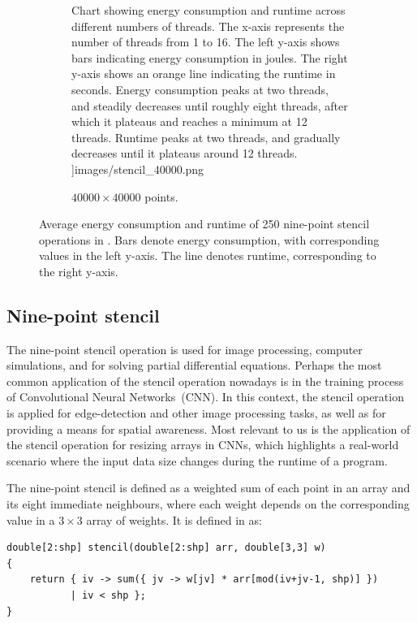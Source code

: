 \begin{figure}[!ht]
\begin{subfigure}{0.33\linewidth}
{            Chart showing energy consumption and runtime across different numbers of threads. The
            x-axis represents the number of threads from 1 to 16. The left y-axis shows bars
            indicating energy consumption in joules. The right y-axis shows an orange line
            indicating the runtime in seconds. Energy consumption peaks at two threads, and steadily
            decreases until roughly eight threads, after which it plateaus and reaches a minimum at
            12 threads. Runtime peaks at two threads, and gradually decreases until it plateaus
            around 12 threads.
        }]{images/stencil_40000.png}
        \caption{$40000 \times 40000$ points.}
        \label{fig:stencil3}
    \end{subfigure}%
    \caption{Average energy consumption and runtime of 250 nine-point stencil operations in \sac{}.
    Bars denote energy consumption, with corresponding values in the left y-axis.
    The line denotes runtime, corresponding to the right y-axis.}
    \label{fig:stencil}
\end{figure}

\subsection{Nine-point stencil}\label{sec:stencil}

The nine-point stencil operation is used for image processing, computer simulations, and for solving
partial differential equations. Perhaps the most common application of the stencil operation
nowadays is in the training process of Convolutional Neural Networks~(CNN). In this context, the
stencil operation is applied for edge-detection and other image processing tasks, as well as for
providing a means for spatial awareness. Most relevant to us is the application of the stencil
operation for resizing arrays in CNNs, which highlights a real-world scenario where the input data
size changes during the runtime of a program.

The nine-point stencil is defined as a weighted sum of each point in an array and its eight
immediate neighbours, where each weight depends on the corresponding value in a $3 \times 3$ array
of weights. It is defined in \sac{} as:
\begin{verbatim}
double[2:shp] stencil(double[2:shp] arr, double[3,3] w)
{
    return { iv -> sum({ jv -> w[jv] * arr[mod(iv+jv-1, shp)] })
           | iv < shp };
}
\end{verbatim}

